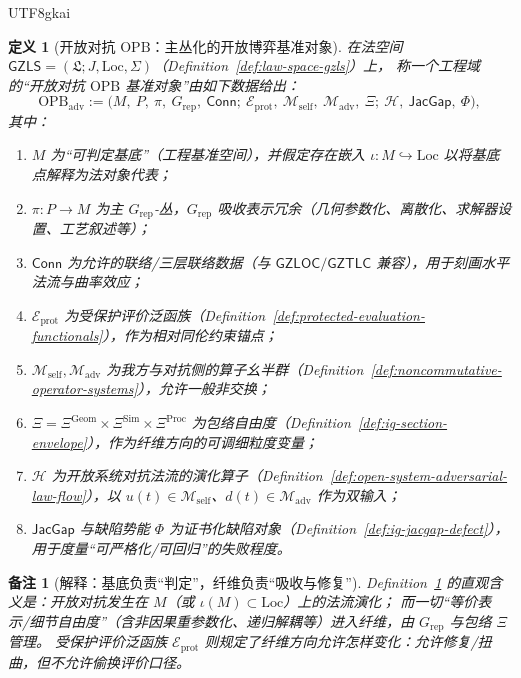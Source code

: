 \documentclass[12pt]{article}
\newtheorem{definition}{定义}[section]
\newtheorem{remark}{备注}[section]
\newcommand{\GZLS}{\ensuremath{\mathsf{GZLS}}}
\newcommand{\GZLOC}{\ensuremath{\mathsf{GZLOC}}}
\newcommand{\GZTLC}{\ensuremath{\mathsf{GZTLC}}}
\newcommand{\JacGap}{\ensuremath{\mathsf{JacGap}}}
\newcommand{\OPB}{\ensuremath{\mathrm{OPB}}}
\newcommand{\Conn}{\ensuremath{\mathsf{Conn}}}
\begin{document}
\begin{CJK*}{UTF8}{gkai}
\begin{definition}[开放对抗 \OPB{}：主丛化的开放博弈基准对象]
\label{def:open-adversarial-opb-object}
在法空间 $\GZLS=(\mathfrak{L};J,\mathrm{Loc},\Sigma)$（Definition~\ref{def:law-space-gzls}）上，
称一个工程域的“开放对抗 \OPB{} 基准对象”由如下数据给出：
\[
\OPB_{\mathrm{adv}}
:=
\bigl(
  M,\ P,\ \pi,\ G_{\mathrm{rep}},\ \Conn;\
  \mathcal{E}_{\mathrm{prot}},\ \mathcal{M}_{\mathrm{self}},\ \mathcal{M}_{\mathrm{adv}},\ \Xi;\
  \mathcal{H},\ \JacGap,\ \Phi
\bigr),
\]
其中：
\begin{enumerate}
  \item $M$ 为“可判定基底”（工程基准空间），并假定存在嵌入 $\iota:M\hookrightarrow \mathrm{Loc}$ 以将基底点解释为法对象代表；
  \item $\pi:P\to M$ 为主 $G_{\mathrm{rep}}$‑丛，$G_{\mathrm{rep}}$ 吸收表示冗余（几何参数化、离散化、求解器设置、工艺叙述等）；
  \item $\Conn$ 为允许的联络/三层联络数据（与 $\GZLOC/\GZTLC$ 兼容），用于刻画水平法流与曲率效应；
  \item $\mathcal{E}_{\mathrm{prot}}$ 为受保护评价泛函族（Definition~\ref{def:protected-evaluation-functionals}），作为相对同伦约束锚点；
  \item $\mathcal{M}_{\mathrm{self}},\mathcal{M}_{\mathrm{adv}}$ 为我方与对抗侧的算子幺半群（Definition~\ref{def:noncommutative-operator-systems}），允许一般非交换；
  \item $\Xi=\Xi^{\mathrm{Geom}}\times\Xi^{\mathrm{Sim}}\times\Xi^{\mathrm{Proc}}$ 为包络自由度（Definition~\ref{def:ig-section-envelope}），作为纤维方向的可调细粒度变量；
  \item $\mathcal{H}$ 为开放系统对抗法流的演化算子（Definition~\ref{def:open-system-adversarial-law-flow}），以 $u(t)\in\mathcal{M}
    _{\mathrm{self}}$、$d(t)\in\mathcal{M}_{\mathrm{adv}}$ 作为双输入；
  \item $\JacGap$ 与缺陷势能 $\Phi$ 为证书化缺陷对象（Definition~\ref{def:ig-jacgap-defect}），用于度量“可严格化/可回归”的失败程度。
\end{enumerate}
\end{definition}

\begin{remark}[解释：基底负责“判定”，纤维负责“吸收与修复”]
Definition~\ref{def:open-adversarial-opb-object} 的直观含义是：开放对抗发生在 $M$（或 $\iota(M)\subset\mathrm{Loc}$）上的法流演化；
而一切“等价表示/细节自由度”（含非因果重参数化、递归解耦等）进入纤维，由 $G_{\mathrm{rep}}$ 与包络 $\Xi$ 管理。
受保护评价泛函族 $\mathcal{E}_{\mathrm{prot}}$ 则规定了纤维方向允许怎样变化：允许修复/扭曲，但不允许偷换评价口径。
\end{remark}


\end{CJK*}
\end{document}
